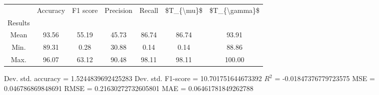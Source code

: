 \begin{tabular}{|c|c|c|c|c|c|c|}
\toprule
{} &  Accuracy &  F1 score &  Precision &  Recall &  \$T\_\{\textbackslash mu\}\$ &  \$T\_\{\textbackslash gamma\}\$ \\
Results &           &           &            &         &            &               \\
\hline
Mean    &     93.56 &     55.19 &      45.73 &   86.74 &      86.74 &         93.91 \\
Min.    &     89.31 &      0.28 &      30.88 &    0.14 &       0.14 &         88.86 \\
Max.    &     96.07 &     63.12 &      90.48 &   98.11 &      98.11 &        100.00 \\
\bottomrule
\end{tabular}

 Dev. std. accuracy = 1.5244839692425283
 Dev. std. F1-score = 10.701751644673392
 $R^2$ = -0.01847376779723575
 MSE = 0.046786869848691
 RMSE = 0.21630272732605801
 MAE = 0.06461781849262788